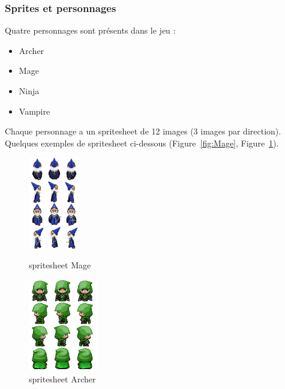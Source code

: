 \documentclass[11pt]{article}
\begin{document}
            \subsubsection{Sprites et personnages}
            Quatre personnages sont présents dans le jeu :
            \begin{itemize}
                \item Archer
                \item Mage
                \item Ninja
                \item Vampire
            \end{itemize}
            Chaque personnage a un spritesheet de 12 images (3 images par direction).\\
            Quelques exemples de spritesheet ci-dessous (Figure~\ref{fig:Mage}, Figure~\ref{fig:Archer}). 
            \begin{figure}[H]
                \centering
                \begin{minipage}{0.45\textwidth}
                    \centering
                    \includegraphics[height=4cm]{mageSrc.png}
                    \caption{spritesheet Mage}
                    \label{fig:Mage}
                \end{minipage}
                \hfill
                \begin{minipage}{0.45\textwidth}
                    \centering
                    \includegraphics[height=4cm]{archerSRC.png}
                    \caption{spritesheet Archer}
                    \label{fig:Archer}
                \end{minipage}
            \end{figure}
\end{document}

